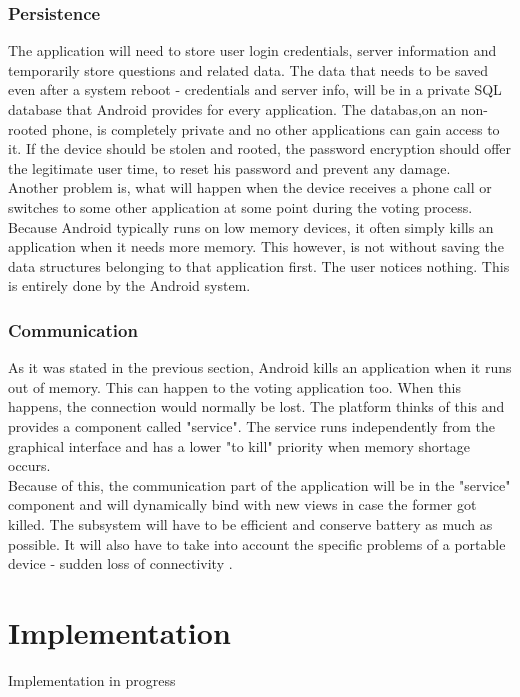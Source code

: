 \documentclass[11pt,twoside,a4paper]{book}
\begin{document}
\subsection{Persistence}
The application will need to store user login credentials, server information and temporarily store questions and related data. The data that needs to be saved even after a system reboot - credentials and server info, will be in a private SQL database that Android provides for every application. The databas,on an non-rooted\cite{whatIsRoot}  phone,  is completely private and no other applications can gain access to it. If the device should be stolen and rooted, the password encryption should offer the legitimate user time, to reset his password and prevent any damage. \\
Another problem is, what will happen when the device receives a phone call or switches to some other application \cite{bakalarkaJV} at some point during the voting process. Because Android typically runs on low memory devices, it often simply kills an application when it needs more memory. This however, is not without saving the data structures belonging to that application first. The user notices nothing. This is entirely done by the Android system.\\

\subsection{Communication}
As it was stated in the previous section, Android kills an application when it runs out of memory. This can happen to the voting application too. When this happens, the connection would normally be lost. The platform thinks of this and provides a component called "service". The service runs independently from the graphical interface and has a lower "to kill" priority when memory shortage occurs. \\

Because of this, the communication part of the application will be in the "service" component and will dynamically bind with new views in case the former got killed. The subsystem will have to be efficient and conserve battery as much as possible. It will also have to take into account the specific problems of a portable device - sudden loss of connectivity \cite{bakalarkaJV}. 




	
\chapter{Implementation}
Implementation in progress
\end{document}
